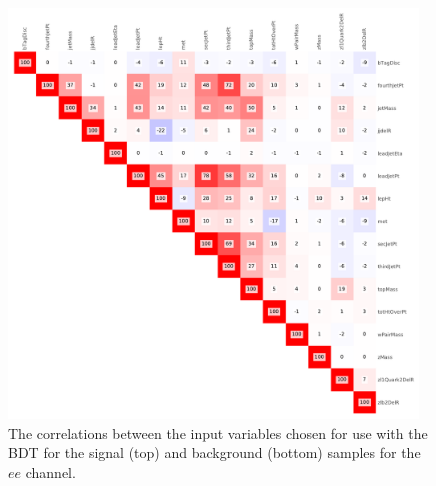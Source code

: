 \begin{figure}[htbp]
\includegraphics[width=0.97\textwidth]{figs/background-estimation/plots/corr_bkg_ee.pdf}
\caption{
The correlations between the input variables chosen for use with the BDT for the signal (top) and background (bottom) samples for the $ee$ channel.}
\label{fig:corr_ee}
\end{figure}

